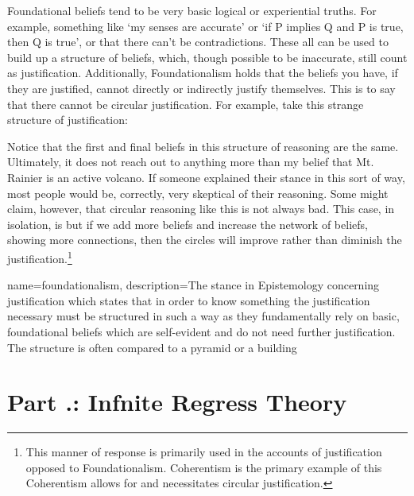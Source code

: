 Foundational beliefs tend to be very basic logical or experiential truths. For example, something like `my senses are accurate' or `if P implies Q and P is true, then Q is true', or that there can't be contradictions. These all can be used to build up a structure of beliefs, which, though possible to be inaccurate, still count as justification. Additionally, Foundationalism holds that the beliefs you have, if they are justified, cannot directly or indirectly justify themselves. This is to say that there cannot be circular justification. For example, take this strange structure of justification:


Notice that the first and final beliefs in this structure of reasoning are the same. Ultimately, it does not reach out to anything more than my belief that Mt. Rainier is an active volcano. If someone explained their stance in this sort of way, most people would be, correctly, very skeptical of their reasoning. Some might claim, however, that circular reasoning like this is not always bad. This case, in isolation, is but if we add more beliefs and increase the network of beliefs, showing more connections, then the circles will improve rather than diminish the justification.\footnote{This manner of response is primarily used in the accounts of justification opposed to Foundationalism. Coherentism is the primary example of this Coherentism allows for and necessitates circular justification.}

{
name=foundationalism,
description={The stance in Epistemology concerning justification which states that in order to know something the justification necessary must be structured in such a way as they fundamentally rely on basic, foundational beliefs which are self-evident and do not need further justification. The structure is often compared to a pyramid or a building}
}


\section{Part \thechapcount.\theseccount: Infnite Regress Theory}

